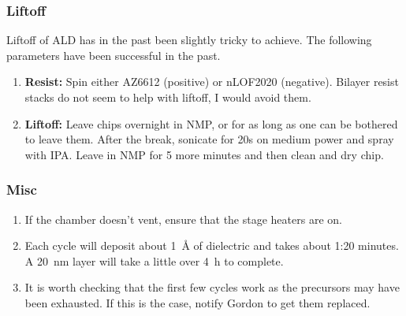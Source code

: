 \subsubsection{Liftoff}
Liftoff of ALD has in the past been slightly tricky to achieve. The following parameters have been successful in the past.
\begin{enumerate}
\item \textbf{Resist: } Spin either AZ6612 (positive) or nLOF2020 (negative). Bilayer resist stacks do not seem to help with liftoff, I would avoid them.
\item \textbf{Liftoff: } Leave chips overnight in NMP, or for as long as one can be bothered to leave them. After the break, sonicate for 20s on medium power
    and spray with IPA. Leave in NMP for 5 more minutes and then clean and dry chip.
\end{enumerate}

\subsubsection{Misc}
\begin{enumerate}
\item If the chamber doesn't vent, ensure that the stage heaters are on.
\item Each cycle will deposit about \SI{1}{\angstrom} of dielectric and takes about 1:20 minutes. A \SI{20}{\nano\meter} layer
will take a little over \SI{4}{\hour} to complete.
\item It is worth checking that the first few cycles work as the precursors may have been exhausted. If this is the case, notify Gordon to get them replaced.
\end{enumerate}
\newpage

